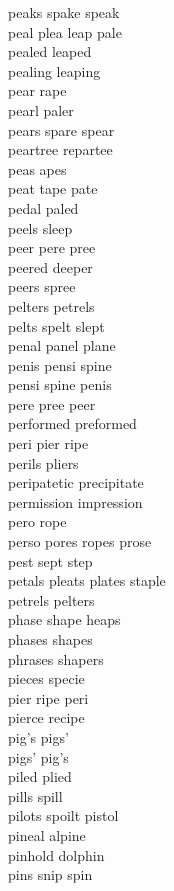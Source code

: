 peaks spake speak\\
peal plea leap pale\\
pealed leaped\\
pealing leaping\\
pear rape\\
pearl paler\\
pears spare spear\\
peartree repartee\\
peas apes\\
peat tape pate\\
pedal paled\\
peels sleep\\
peer pere pree\\
peered deeper\\
peers spree\\
pelters petrels\\
pelts spelt slept\\
penal panel plane\\
penis pensi spine\\
pensi spine penis\\
pere pree peer\\
performed preformed\\
peri pier ripe\\
perils pliers\\
peripatetic precipitate\\
permission impression\\
pero rope\\
perso pores ropes prose\\
pest sept step\\
petals pleats plates staple\\
petrels pelters\\
phase shape heaps\\
phases shapes\\
phrases shapers\\
pieces specie\\
pier ripe peri\\
pierce recipe\\
pig's pigs'\\
pigs' pig's\\
piled plied\\
pills spill\\
pilots spoilt pistol\\
pineal alpine\\
pinhold dolphin\\
pins snip spin\\
